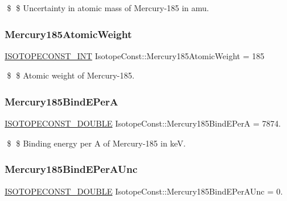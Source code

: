 \$ \$ Uncertainty in atomic mass of Mercury-\/185 in amu. \mbox{\label{group___isotope_const-_mercury-_hg185_ga4dceac49e21e9b6b1512a45008ed9f0e}} 
\subsubsection{\texorpdfstring{Mercury185\+Atomic\+Weight}{Mercury185AtomicWeight}}
{\footnotesize\ttfamily \mbox{\hyperlink{group___isotope_const-_macros_ga5f18360b3e99483a35c32d789e62621c}{I\+S\+O\+T\+O\+P\+E\+C\+O\+N\+S\+T\+\_\+\+I\+NT}} Isotope\+Const\+::\+Mercury185\+Atomic\+Weight = 185}

\$ \$ Atomic weight of Mercury-\/185. \mbox{\label{group___isotope_const-_mercury-_hg185_gaaca66a9b3a1011f64d96380fbdf8da57}} 
\subsubsection{\texorpdfstring{Mercury185\+Bind\+E\+PerA}{Mercury185BindEPerA}}
{\footnotesize\ttfamily \mbox{\hyperlink{group___isotope_const-_macros_ga8f45a7272ce02c0b4c65c44636ed719a}{I\+S\+O\+T\+O\+P\+E\+C\+O\+N\+S\+T\+\_\+\+D\+O\+U\+B\+LE}} Isotope\+Const\+::\+Mercury185\+Bind\+E\+PerA = 7874.}

\$ \$ Binding energy per A of Mercury-\/185 in keV. \mbox{\label{group___isotope_const-_mercury-_hg185_ga9acc780d791c6b3b9b852c0b9348faf6}} 
\subsubsection{\texorpdfstring{Mercury185\+Bind\+E\+Per\+A\+Unc}{Mercury185BindEPerAUnc}}
{\footnotesize\ttfamily \mbox{\hyperlink{group___isotope_const-_macros_ga8f45a7272ce02c0b4c65c44636ed719a}{I\+S\+O\+T\+O\+P\+E\+C\+O\+N\+S\+T\+\_\+\+D\+O\+U\+B\+LE}} Isotope\+Const\+::\+Mercury185\+Bind\+E\+Per\+A\+Unc = 0.}

